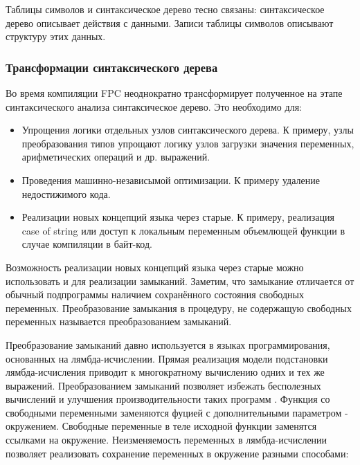 \documentclass{imcs}
\begin{document}
Таблицы символов и синтаксическое дерево тесно связаны: синтаксическое дерево описывает действия с
данными. Записи таблицы символов описывают структуру этих данных.

\subsubsection{Трансформации синтаксического дерева}

Во время компиляции FPC неоднократно трансформирует полученное на этапе синтаксического 
анализа синтаксическое дерево. Это необходимо для:
\begin{itemize}
    \item Упрощения логики отдельных узлов синтаксического дерева. К 
примеру, узлы преобразования типов упрощают логику узлов загрузки значения переменных,
арифметических операций и др. выражений.
    \item Проведения машинно-независымой оптимизации. К примеру удаление недостижимого
кода.
    \item Реализации новых концепций языка через старые. К примеру, реализация
case of string\cite{misha} или доступ к локальным переменным объемлющей функции в
случае компиляции в байт-код.
\end{itemize}      

Возможность реализации новых концепций языка через старые можно использовать и
для реализации замыканий. Заметим, что замыкание отличается от 
обычный подпрограммы наличием сохранённого состояния свободных переменных. Преобразование
замыкания в процедуру, не содержащую свободных переменных называется преобразованием
замыканий\cite{moderncompiler}.

Преобразование замыканий давно используется в языках программирования, основанных на
лямбда-исчислении. Прямая реализация модели подстановки
лямбда-исчисления приводит к многократному вычислению одних и тех же выражений.
Преобразованием замыканий позволяет избежать бесполезных вычислений
и улучшения производительности таких программ \cite{lambdaclosure95}. 
Функция со свободными переменными
заменяются фуцией с дополнительными параметром - окружением. Свободные переменные
в теле исходной функции заменятся ссылками на окружение.  
Неизменяемость переменных в лямбда-исчислении позволяет реализовать сохранение
переменных в окружение разными способами:

\end{document}
